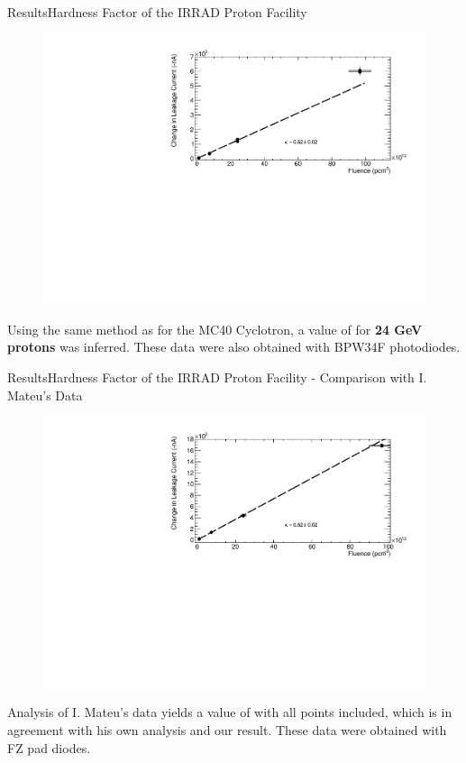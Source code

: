 \documentclass{beamer}
\begin{document}
    \begin{frame}{Results}{Hardness Factor of the IRRAD Proton Facility}
        \begin{figure}
            \centering
            \includegraphics[width = 0.9\linewidth]{IRRAD_seminar.pdf}
        \end{figure}
    Using the same method as for the MC40 Cyclotron, a value of  for \textbf{24 GeV protons} was inferred. These data were also obtained with BPW34F photodiodes.
    \end{frame}
    
    \begin{frame}{Results}{Hardness Factor of the IRRAD Proton Facility - Comparison with I. Mateu's Data}
        \begin{figure}
            \centering
            \includegraphics[width = 0.9\linewidth]{Isidre_seminar.pdf}
        \end{figure}
    \vspace{-0.5cm}
    Analysis of I. Mateu's data yields a value of  with all points included, which is in agreement with his own analysis and our result. These data were obtained with FZ pad diodes.
    \end{frame}
    
\end{document}
